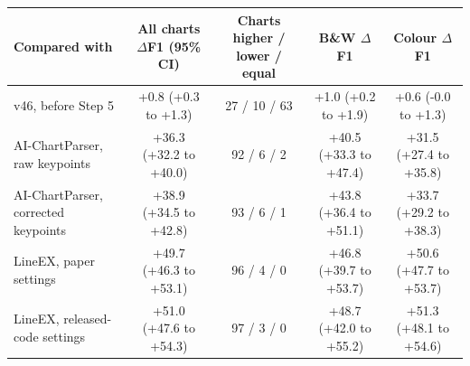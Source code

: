 \begin{tabular}{lcccc}
\toprule
Compared with & All charts $\Delta$F1 (95\% CI) & Charts higher / lower / equal & B\&W $\Delta$F1 & Colour $\Delta$F1 \\
\midrule
v46, before Step 5 & +0.8 (+0.3 to +1.3) & 27 / 10 / 63 & +1.0 (+0.2 to +1.9) & +0.6 (-0.0 to +1.3) \\
AI-ChartParser, raw keypoints & +36.3 (+32.2 to +40.0) & 92 / 6 / 2 & +40.5 (+33.3 to +47.4) & +31.5 (+27.4 to +35.8) \\
AI-ChartParser, corrected keypoints & +38.9 (+34.5 to +42.8) & 93 / 6 / 1 & +43.8 (+36.4 to +51.1) & +33.7 (+29.2 to +38.3) \\
LineEX, paper settings & +49.7 (+46.3 to +53.1) & 96 / 4 / 0 & +46.8 (+39.7 to +53.7) & +50.6 (+47.7 to +53.7) \\
LineEX, released-code settings & +51.0 (+47.6 to +54.3) & 97 / 3 / 0 & +48.7 (+42.0 to +55.2) & +51.3 (+48.1 to +54.6) \\
\bottomrule
\end{tabular}

